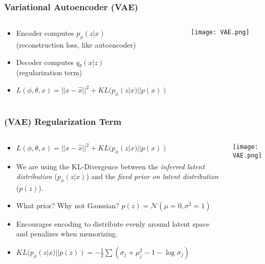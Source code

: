 \begin{frame}
    \frametitle{Variational Autoencoder (VAE)}
    \begin{columns}
        \begin{column}{0.60\paperwidth}
            \begin{itemize}
                \item<1-> Encoder computes $p_\phi(z|x)$ \\(reconstruction loss, like
                    autoencoder)
                \item<2-> Decoder computes $q_\theta(x|z)$ \\(regularization term)
                \item<3-> $L(\phi,\theta,x) = ||x - \hat{x}||^2 + KL(p_\phi(z|x)
                    || p(x))$
            \end{itemize}
        \end{column}
        \begin{column}{0.40\paperwidth}
            \texttt{[image: VAE.png]}
        \end{column}
    \end{columns}
\end{frame}

\begin{frame}
    \frametitle{(VAE) Regularization Term}
    \begin{columns}
        \begin{column}{0.60\paperwidth}
            \begin{itemize}
                \item $L(\phi,\theta,x) = ||x - \hat{x}||^2 + KL(p_\phi(z|x)
                    || p(x))$
                \item We are using the KL-Divergence between the
                    \textit{inferred latent distribution} ($p_\phi(z|x)$) and
                    the \textit{fixed prior on latent distribution} ($p(z)$).
                \item What prior? Why not Gaussian? $p(z) =
                    \mathcal{N}(\mu=0, \sigma^2=1)$
                \item Encourages encoding to distribute evenly around latent
                    space and penalizes when memorizing.
                \item $KL(p_\phi(z|x) || p(z)) = -\frac12\sum(\sigma_j +
                    \mu_j^2 - 1 -\log{\sigma_j})$
            \end{itemize}
        \end{column}
        \begin{column}{0.40\paperwidth}
            \texttt{[image: VAE.png]}
        \end{column}
    \end{columns}
\end{frame}

